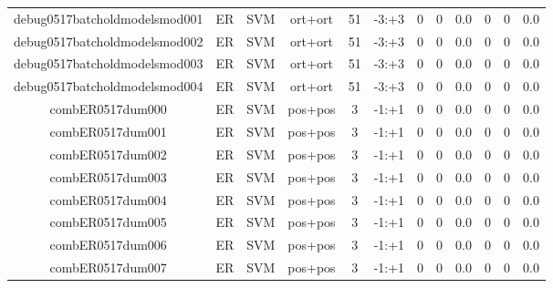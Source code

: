 \documentclass[a4paper]{article}
\begin{document}
\begin{landscape}
\begin{center}
\begin{tabular}{ |c|c|c|c|c|c|c|c|c|c|c|c|}
 
 	
 	\small{ debug0517batcholdmodelsmod001 } & ER & SVM & ort+ort  &  51 &  -3:+3  &  0 & 0 & 0.0  &  0 & 0 & 0.0 \\
 	

 
 	
 	\small{ debug0517batcholdmodelsmod002 } & ER & SVM & ort+ort  &  51 &  -3:+3  &  0 & 0 & 0.0  &  0 & 0 & 0.0 \\
 	

 
 	
 	\small{ debug0517batcholdmodelsmod003 } & ER & SVM & ort+ort  &  51 &  -3:+3  &  0 & 0 & 0.0  &  0 & 0 & 0.0 \\
 	

 
 	
 	\small{ debug0517batcholdmodelsmod004 } & ER & SVM & ort+ort  &  51 &  -3:+3  &  0 & 0 & 0.0  &  0 & 0 & 0.0 \\
 	

 
 	
 	\small{ combER0517dum000 } & ER & SVM & pos+pos  &  3 &  -1:+1  &  0 & 0 & 0.0  &  0 & 0 & 0.0 \\
 	

 
 	
 	\small{ combER0517dum001 } & ER & SVM & pos+pos  &  3 &  -1:+1  &  0 & 0 & 0.0  &  0 & 0 & 0.0 \\
 	

 
 	
 	\small{ combER0517dum002 } & ER & SVM & pos+pos  &  3 &  -1:+1  &  0 & 0 & 0.0  &  0 & 0 & 0.0 \\
 	

 
 	
 	\small{ combER0517dum003 } & ER & SVM & pos+pos  &  3 &  -1:+1  &  0 & 0 & 0.0  &  0 & 0 & 0.0 \\
 	

 
 	
 	\small{ combER0517dum004 } & ER & SVM & pos+pos  &  3 &  -1:+1  &  0 & 0 & 0.0  &  0 & 0 & 0.0 \\
 	

 
 	
 	\small{ combER0517dum005 } & ER & SVM & pos+pos  &  3 &  -1:+1  &  0 & 0 & 0.0  &  0 & 0 & 0.0 \\
 	

 
 	
 	\small{ combER0517dum006 } & ER & SVM & pos+pos  &  3 &  -1:+1  &  0 & 0 & 0.0  &  0 & 0 & 0.0 \\
 	

 
 	
 	\small{ combER0517dum007 } & ER & SVM & pos+pos  &  3 &  -1:+1  &  0 & 0 & 0.0  &  0 & 0 & 0.0 \\
 	


\end{tabular}
\end{center}
\end{landscape}
\end{document}
